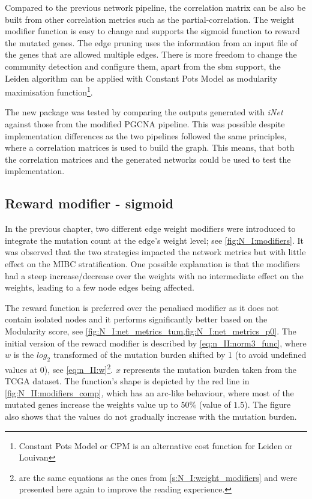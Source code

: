 Compared to the previous network pipeline, the correlation matrix can be also be built from other correlation metrics such as the partial-correlation. The weight modifier function is easy to change and supports the sigmoid function to reward the mutated genes. The edge pruning uses the information from an input file of the genes that are allowed multiple edges. There is more freedom to change the community detection and configure them, apart from the \acrfull{sbm} support, the Leiden algorithm can be applied with Constant Pots Model as modularity maximisation function\footnote{Constant Pots Model or CPM is an alternative cost function for Leiden or Louivan}.

The new package was tested by comparing the outputs generated with \textit{iNet} against those from the modified PGCNA pipeline. This was possible despite implementation differences as the two pipelines followed the same principles, where a correlation matrices is used to build the graph. This means, that both the correlation matrices and the generated networks could be used to test the implementation.

\subsection*{Reward modifier - sigmoid} \label{s:N_II:reward}

In the previous chapter, two different edge weight modifiers were introduced to integrate the mutation count at the edge's weight level; see \cref{fig:N_I:modifiers}. It was observed that the two strategies impacted the network metrics but with little effect on the MIBC stratification. One possible explanation is that the modifiers had a steep increase/decrease over the weights with no intermediate effect on the weights, leading to a few node edges being affected. 

The reward function is preferred over the penalised modifier as it does not contain isolated nodes and it performs significantly better based on the Modularity score, see \cref{fig:N_I:net_metrics_tum,fig:N_I:net_metrics_p0}. The initial version of the reward modifier is described by \cref{eq:n_II:norm3_func}, where $w$ is the $log_2$ transformed of the mutation burden shifted by 1 (to avoid undefined values at 0), see \cref{eq:n_II:w}\footnote{ are the same equations as the ones from \cref{s:N_I:weight_modifiers} and were presented here again to improve the reading experience.}. $x$ represents the mutation burden taken from the TCGA dataset. The function's shape is depicted by the red line in \cref{fig:N_II:modifiers_comp}, which has an arc-like behaviour, where most of the mutated genes increase the weights value up to $50\%$ (value of $1.5$). The figure also shows that the values do not gradually increase with the mutation burden.

